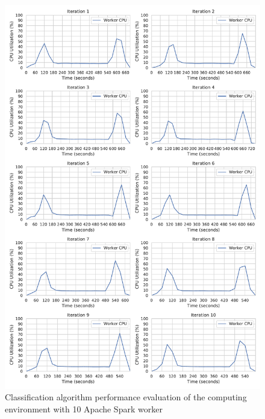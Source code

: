 \begin{figure}[h]
\centering
\includegraphics[scale=0.4]{images/07_evaluation/mortgage/mortgage_10_worker_cpu_performance}
\caption{Classification algorithm performance evaluation of the computing environment with 10 Apache Spark worker}
\label{fig:07_mortgage_static-cpu_results}
\end{figure}

